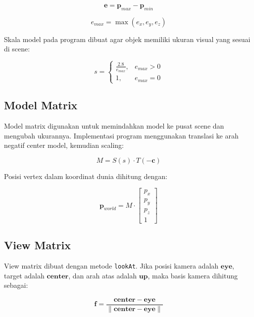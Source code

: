 \documentclass[12pt,a4paper]{article}
\begin{document}
\begin{equation}
    \mathbf{e} = \mathbf{p}_{max} - \mathbf{p}_{min}
\end{equation}

\begin{equation}
    e_{max} = \max(e_x, e_y, e_z)
\end{equation}

Skala model pada program dibuat agar objek memiliki ukuran visual yang sesuai
di scene:

\begin{equation}
    s =
    \begin{cases}
        \frac{2.8}{e_{max}}, & e_{max} > 0 \\
        1, & e_{max} = 0
    \end{cases}
\end{equation}

\subsection{Model Matrix}

Model matrix digunakan untuk memindahkan model ke pusat scene dan mengubah
ukurannya. Implementasi program menggunakan translasi ke arah negatif center
model, kemudian scaling:

\begin{equation}
    M = S(s) \cdot T(-\mathbf{c})
\end{equation}

Posisi vertex dalam koordinat dunia dihitung dengan:

\begin{equation}
    \mathbf{p}_{world} = M \cdot
    \begin{bmatrix}
        p_x \\ p_y \\ p_z \\ 1
    \end{bmatrix}
\end{equation}

\subsection{View Matrix}

View matrix dibuat dengan metode \texttt{lookAt}. Jika posisi kamera adalah
$\mathbf{eye}$, target adalah $\mathbf{center}$, dan arah atas adalah
$\mathbf{up}$, maka basis kamera dihitung sebagai:

\begin{equation}
    \mathbf{f} =
    \frac{\mathbf{center} - \mathbf{eye}}
    {\|\mathbf{center} - \mathbf{eye}\|}
\end{equation}
\end{document}
